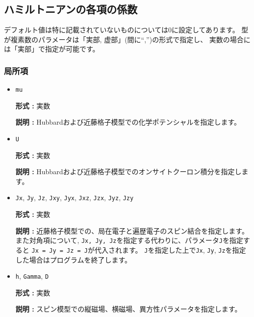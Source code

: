 %
%
%




\subsection{ハミルトニアンの各項の係数}

デフォルト値は特に記載されていないものについては0に設定してあります。
型が複素数のパラメータは「実部, 虚部」(間に``,'')の形式で指定し、
実数の場合には「実部」で指定が可能です。

\subsubsection{局所項}

\begin{itemize}

\item \verb|mu|

{\bf 形式 :} 実数

{\bf 説明 :} Hubbardおよび近藤格子模型での化学ポテンシャルを指定します。

\item \verb|U|

{\bf 形式 :} 実数

{\bf 説明 :} Hubbardおよび近藤格子模型でのオンサイトクーロン積分を指定します。

\item \verb|Jx|, \verb|Jy|, \verb|Jz|, \verb|Jxy|, 
  \verb|Jyx|, \verb|Jxz|, \verb|Jzx|, \verb|Jyz|, \verb|Jzy|

{\bf 形式 :} 実数

{\bf 説明 :} 近藤格子模型での、局在電子と遍歴電子のスピン結合を指定します。
また対角項について, \verb|Jx, Jy, Jz|を指定する代わりに、パラメータ\verb|J|を指定すると
\verb|Jx = Jy = Jz = J|が代入されます。
\verb|J|を指定した上で\verb|Jx|, \verb|Jy|, \verb|Jz|を指定した場合はプログラムを終了します。

\item \verb|h|, \verb|Gamma|, \verb|D|

{\bf 形式 :} 実数

{\bf 説明 :} スピン模型での縦磁場、横磁場、異方性パラメータを指定します。

\end{itemize}

